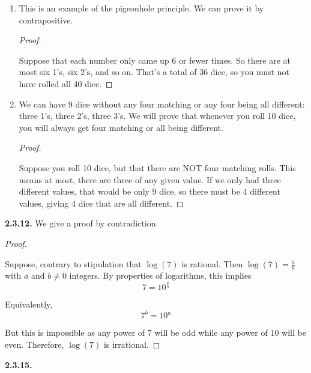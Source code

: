 \documentclass[10pt,]{book}
\theoremstyle{plain}
\theoremstyle{definition}
\theoremstyle{definition}
\theoremstyle{definition}
\theoremstyle{definition}
\numberwithin{equation}{chapter}
\begin{document}
\begin{enumerate}[label=(\alph*)]
\item\hypertarget{li-672}{}\hypertarget{p-1429}{}%
This is an example of the pigeonhole principle. We can prove it by contrapositive.%
\begin{proof}\hypertarget{proof-36}{}
\hypertarget{p-1430}{}%
Suppose that each number only came up 6 or fewer times. So there are at most six 1's, six 2's, and so on. That's a total of 36 dice, so you must not have rolled all 40 dice.%
\end{proof}
\item\hypertarget{li-673}{}\hypertarget{p-1431}{}%
We can have 9 dice without any four matching or any four being all different: three 1's, three 2's, three 3's. We will prove that whenever you roll 10 dice, you will always get four matching or all being different.%
\begin{proof}\hypertarget{proof-37}{}
\hypertarget{p-1432}{}%
Suppose you roll 10 dice, but that there are NOT four matching rolls. This means at most, there are three of any given value. If we only had three different values, that would be only 9 dice, so there must be 4 different values, giving 4 dice that are all different.%
\end{proof}
\end{enumerate}
%
\par\smallskip
\noindent\textbf{2.3.12.} \hypertarget{p-1434}{}%
We give a proof by contradiction.%
\begin{proof}\hypertarget{proof-38}{}
\hypertarget{p-1435}{}%
Suppose, contrary to stipulation that \(\log(7)\) is rational. Then \(\log(7) = \frac{a}{b}\) with \(a\) and \(b \ne 0\) integers. By properties of logarithms, this implies%
\begin{equation*}
7 = 10^{\frac{a}{b}}
\end{equation*}
%
\par
\hypertarget{p-1436}{}%
Equivalently,%
\begin{equation*}
7^b = 10^a
\end{equation*}
%
\par
\hypertarget{p-1437}{}%
But this is impossible as any power of 7 will be odd while any power of 10 will be even.  Therefore, \(\log(7)\) is irrational.%
\end{proof}
\par\smallskip
\noindent\textbf{2.3.15.} \hypertarget{p-1446}{}%
\leavevmode%
\end{document}

